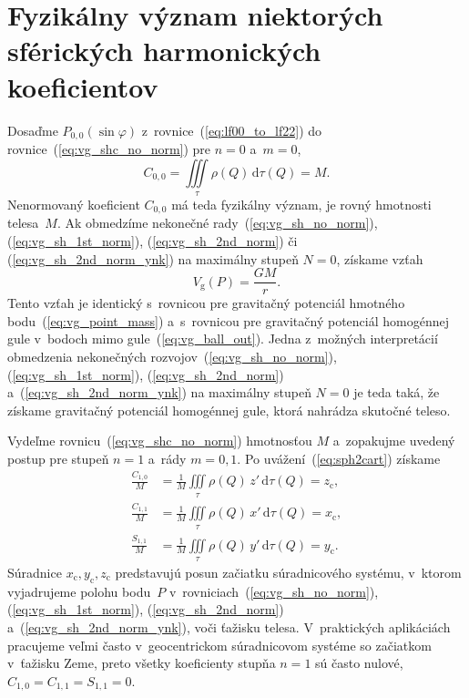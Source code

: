 \documentclass[a4paper, 12pt]{book}
\newcommand{\diff}{\mathrm d}
\newcommand{\gidx}{\mathrm g}
\begin{document}

\section{Fyzikálny význam niektorých sférických harmonických koeficientov}
\label{sec:physical_meaning_of_spherical_harmonic_coefficients}

Dosaďme $P_{0,0}(\sin\varphi)$ z~rovnice~(\ref{eq:lf00_to_lf22})
do rovnice~(\ref{eq:vg_shc_no_norm}) pre $n = 0$ a~$m = 0$,
%
\begin{equation}
\label{eq:c00_mass}
C_{0,0} = \iiint\limits_{\tau} \rho(Q) \, \diff \tau(Q) = M{.}
\end{equation}
%
Nenormovaný koeficient $C_{0,0}$ má teda fyzikálny význam, je rovný hmotnosti 
telesa~$M$.  Ak obmedzíme nekonečné rady~(\ref{eq:vg_sh_no_norm}), 
(\ref{eq:vg_sh_1st_norm}), (\ref{eq:vg_sh_2nd_norm}) či 
(\ref{eq:vg_sh_2nd_norm_ynk}) na maximálny stupeň $N = 0$, získame vzťah
%
\begin{equation}
\label{eq:vg_sh_0degree}
V_\gidx(P) = \frac{GM}{r}{.}
\end{equation}
%
Tento vzťah je identický s~rovnicou pre gravitačný potenciál hmotného 
bodu~(\ref{eq:vg_point_mass}) a~s~rovnicou pre gravitačný potenciál homogénnej 
gule v~bodoch mimo gule~(\ref{eq:vg_ball_out}).  Jedna z~možných interpretácií 
obmedzenia nekonečných rozvojov~(\ref{eq:vg_sh_no_norm}), 
(\ref{eq:vg_sh_1st_norm}), (\ref{eq:vg_sh_2nd_norm}) 
a~(\ref{eq:vg_sh_2nd_norm_ynk}) na maximálny stupeň $N = 0$ je teda taká, že 
získame gravitačný potenciál homogénnej gule, ktorá nahrádza skutočné teleso.

Vydeľme rovnicu~(\ref{eq:vg_shc_no_norm}) hmotnosťou $M$ a~zopakujme uvedený 
postup pre stupeň $n = 1$ a~rády $m = 0, 1$.  Po uvážení~(\ref{eq:sph2cart}) 
získame
%
\begin{equation}
\begin{split}
\frac{C_{1,0}}{M} &= \frac{1}{M} \iiint\limits_{\tau} \rho(Q) \, z' \, \diff 
\tau(Q) = z_\mathrm{c}{,}\\
\frac{C_{1,1}}{M} &= \frac{1}{M} \iiint\limits_{\tau} \rho(Q) \, x' \, \diff 
\tau(Q) = x_\mathrm{c}{,}\\
\frac{S_{1,1}}{M} &= \frac{1}{M} \iiint\limits_{\tau} \rho(Q) \, y' \, \diff 
\tau(Q) = y_\mathrm{c}{.}
\end{split}
\end{equation}
%
Súradnice $x_\mathrm{c}, y_\mathrm{c}, z_\mathrm{c}$ predstavujú posun začiatku 
súradnicového systému, v~ktorom vyjadrujeme polohu bodu~$P$ 
v~rovniciach~(\ref{eq:vg_sh_no_norm}), (\ref{eq:vg_sh_1st_norm}), 
(\ref{eq:vg_sh_2nd_norm}) a~(\ref{eq:vg_sh_2nd_norm_ynk}), voči ťažisku telesa.  
V~praktických aplikáciách pracujeme veľmi často v~geocentrickom súradnicovom 
systéme so začiatkom v~ťažisku Zeme, preto všetky koeficienty stupňa $n = 1$ sú 
často nulové, $C_{1,0} = C_{1,1} = S_{1,1} = 0$.
\end{document}
